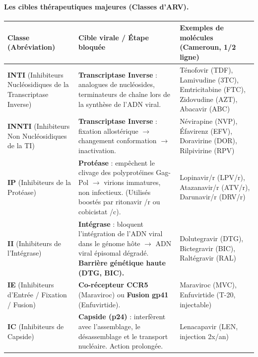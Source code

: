 \documentclass[11pt]{article}
\begin{document}
\paragraph{Les cibles thérapeutiques majeures (Classes d'ARV).}
\begin{center}
\begin{tabularx}{\linewidth}{|l|X|X|}\hline
\rowcolor{popblueL}
\textbf{Classe (Abréviation)} & \textbf{Cible virale / Étape bloquée} & \textbf{Exemples de molécules (Cameroun, 1\up{ère}/2\up{ème} ligne)} \\ \hline
\textbf{INTI} (Inhibiteurs Nucléosidiques de la Transcriptase Inverse) & \textbf{Transcriptase Inverse} : analogues de nucléosides, terminateurs de chaîne lors de la synthèse de l'ADN viral. & Ténofovir (TDF), Lamivudine (3TC), Emtricitabine (FTC), Zidovudine (AZT), Abacavir (ABC) \\ \hline
\textbf{INNTI} (Inhibiteurs Non Nucléosidiques de la TI) & \textbf{Transcriptase Inverse} : fixation allostérique $\rightarrow$ changement conformation $\rightarrow$ inactivation. & Névirapine (NVP), Éfavirenz (EFV), Doravirine (DOR), Rilpivirine (RPV) \\ \hline
\textbf{IP} (Inhibiteurs de la Protéase) & \textbf{Protéase} : empêchent le clivage des polyprotéines Gag-Pol $\rightarrow$ virions immatures, non infectieux. (Utilisés boostés par ritonavir /r ou cobicistat /c). & Lopinavir/r (LPV/r), Atazanavir/r (ATV/r), Darunavir/r (DRV/r) \\ \hline
\textbf{II} (Inhibiteurs de l'Intégrase) & \textbf{Intégrase} : bloquent l'intégration de l'ADN viral dans le génome hôte $\rightarrow$ ADN viral épisomal dégradé. \textbf{Barrière génétique haute (DTG, BIC).} & Dolutegravir (DTG), Bictegravir (BIC), Raltégravir (RAL) \\ \hline
\textbf{IE} (Inhibiteurs d'Entrée / Fixation / Fusion) & \textbf{Co-récepteur CCR5} (Maraviroc) ou \textbf{Fusion gp41} (Enfuvirtide). & Maraviroc (MVC), Enfuvirtide (T-20, injectable) \\ \hline
\textbf{IC} (Inhibiteurs de Capside) & \textbf{Capside (p24)} : interfèrent avec l'assemblage, le désassemblage et le transport nucléaire. Action prolongée. & Lenacapavir (LEN, injection 2x/an) \\ \hline
\end{tabularx}
\end{center}
\end{document}

